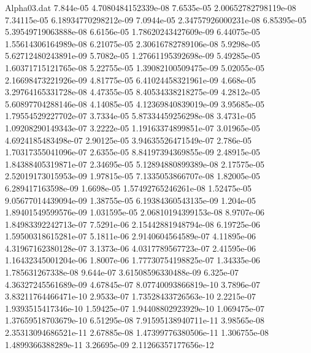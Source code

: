 \begin{filecontents}{Alpha03.dat}
7.844e-05	4.7080484152339e-08
7.6535e-05	2.00652782798119e-08
7.34115e-05	6.18934770298212e-09
7.0944e-05	2.34757926000231e-08
6.85395e-05	5.39549719063888e-08
6.6156e-05	1.78620243427609e-09
6.44075e-05	1.55614306164989e-08
6.21075e-05	2.30616782789106e-08
5.9298e-05	5.62712480243891e-09
5.7082e-05	1.27661195392698e-09
5.49285e-05	1.60371715121765e-08
5.22755e-05	1.39082100509475e-09
5.02055e-05	2.16698473221926e-09
4.81775e-05	6.41024458321961e-09
4.668e-05	3.29764165331728e-08
4.47355e-05	8.40534338218275e-09
4.2812e-05	5.60897704288146e-08
4.14085e-05	4.12369840839019e-09
3.95685e-05	1.79554529227702e-07
3.7334e-05	5.87334459256298e-08
3.4731e-05	1.09208290149343e-07
3.2222e-05	1.19163374899851e-07
3.01965e-05	4.6924185483498e-07
2.90125e-05	3.94635526471549e-07
2.786e-05	1.70317355041096e-07
2.6355e-05	8.84197394369855e-09
2.48915e-05	1.84388405319871e-07
2.34695e-05	5.12894880899389e-08
2.17575e-05	2.52019173015953e-09
1.97815e-05	7.1335053866707e-08
1.82005e-05	6.289417163598e-09
1.6698e-05	1.57492765246261e-08
1.52475e-05	9.05677014439094e-09
1.38755e-05	6.19384360543135e-09
1.204e-05	1.89401549599576e-09
1.031595e-05	2.06810194399153e-08
8.9707e-06	1.84983392242713e-07
7.5291e-06	2.15442881948794e-08
6.19725e-06	1.59500318615281e-07
5.1811e-06	2.9140604564589e-07
4.11895e-06	4.31967162380128e-07
3.1373e-06	4.0317789567723e-07
2.41595e-06	1.16432345001204e-06
1.8007e-06	1.77730754198825e-07
1.34335e-06	1.785631267338e-08
9.644e-07	3.61508596330488e-09
6.325e-07	4.36327245561689e-09
4.67845e-07	8.07740093866819e-10
3.7896e-07	3.83211764466471e-10
2.9533e-07	1.73528433726563e-10
2.2215e-07	1.9393515417346e-10
1.59425e-07	1.94408802923929e-10
1.069475e-07	1.37659518703679e-10
6.51295e-08	7.91595138940711e-11
3.98565e-08	2.35313094686521e-11
2.67885e-08	1.47399776380506e-11
1.306755e-08	1.4899366388289e-11
3.26695e-09	2.11266357177656e-12
\end{filecontents}

